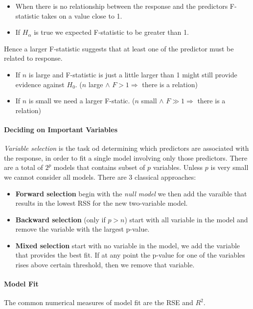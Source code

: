 \documentclass[a4paper]{article}
\begin{document}
					\begin{itemize}
						\item When there is no relationship between the response and the predictors F-statistic takes on a value close to 1.
						\item If $H_\alpha$ is true we expected F-statistic to be greater than 1.
					\end{itemize}
					
					Hence a larger F-statistic suggests that at least one of the predictor must be related to response.
						\begin{itemize}
							\item If $n$ is large and F-statistic is just a little larger than 1 might still provide evidence against $H_0$. ($n$ large $\land$ $F > 1 \Rightarrow$ there is a relation)
							\item If $n$ is small we need a larger F-static. ($n$ small $\land$ $F \gg 1 \Rightarrow$ there is a relation)
						\end{itemize}															
					\paragraph{Deciding on Important Variables}
						\textit{Variable selection} is the task od determining which predictors are associated with the response, in order to fit a single model involving only those predictors.
						There are a total of $2^p$ models that contains subset of $p$ variables. Unless $p$ is very small we cannot consider all models. There are 3 classical approaches:
						\begin{itemize}
							\item \textbf{Forward selection} begin with the \textit{null model} we then add the varaible that results in the lowest RSS for the new two-variable model.
							\item \textbf{Backward selection} (only if $p > n$) start with all variable in the model and remove the variable with the largest p-value.
							\item \textbf{Mixed selection} start with no variable in the model, we add the variable that provides the best fit. If at any point the p-value for one of the variables rises above certain threshold, then we remove that variable.
						\end{itemize}
						
						\paragraph{Model Fit}
							The common numerical measures of model fit are the RSE and $R^2$.
							
\end{document}
